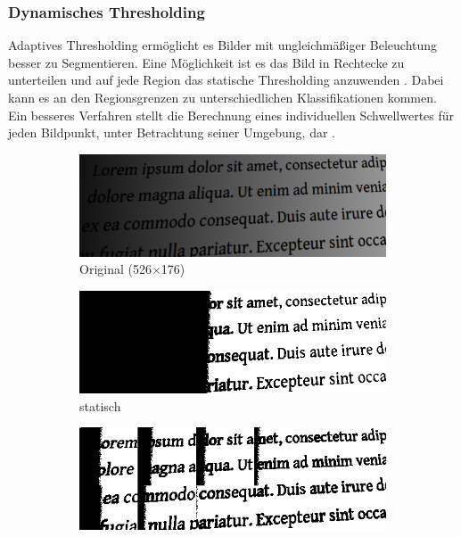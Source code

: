 \subsubsection*{Dynamisches Thresholding}
Adaptives Thresholding ermöglicht es Bilder mit ungleichmäßiger Beleuchtung besser zu Segmentieren.
Eine Möglichkeit ist es das Bild in Rechtecke zu unterteilen und auf jede Region das statische Thresholding anzuwenden \cite[S.~88--89]{davies2012}.
Dabei kann es an den Regionsgrenzen zu unterschiedlichen Klassifikationen kommen.
Ein besseres Verfahren stellt die Berechnung eines individuellen Schwellwertes für jeden Bildpunkt, unter Betrachtung seiner Umgebung, dar \cite[Kapitel~4.4.2]{davies2012}.

\begin{figure}[H]
  \label{fig:segmentation}
  \centering
  \begin{subfigure}{0.49\linewidth}
    \centering
    \includegraphics[width=\linewidth]{img/basics/segmentation/original}
    \caption{Original (526$\times$176)}
  \end{subfigure}
  \begin{subfigure}{0.49\linewidth}
    \centering
    \includegraphics[width=\linewidth]{img/basics/segmentation/global}
    \caption{statisch}
  \end{subfigure}
  \begin{subfigure}{0.49\linewidth}
    \centering
    \includegraphics[width=\linewidth]{img/basics/segmentation/local}

\end{subfigure}
\end{figure}
